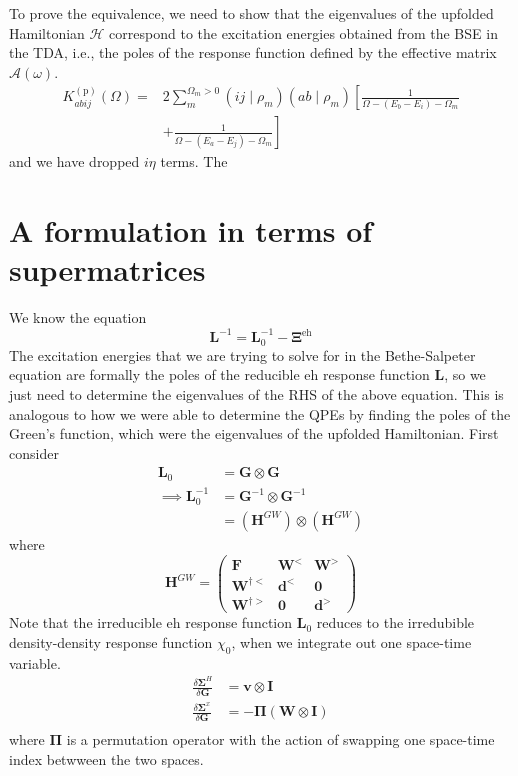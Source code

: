 To prove the equivalence, we need to show that the eigenvalues of the upfolded Hamiltonian $\mathcal{H}$ correspond to the excitation energies obtained from the BSE in the TDA, i.e., the poles of the response function defined by the effective matrix $\mathcal{A}(\omega)$.
$$
\begin{aligned}
K_{a b i j}^{(\mathrm{p})}(\Omega)= & 2 \sum_m^{\Omega_m>0}\left(i j \mid \rho_m\right)\left(a b \mid \rho_m\right)\left[\frac{1}{\Omega-\left(E_b-E_i\right)-\Omega_m}\right. \\
& \left.+\frac{1}{\Omega-\left(E_a-E_j\right)-\Omega_m}\right]
\end{aligned}
$$
 and we have dropped $i \eta$ terms. The
\section{A formulation in terms of supermatrices}
We know the equation
\begin{equation}
    \bm{L}^{-1} = \bm{L}_0^{-1} - \bm{\Xi}^{\mathrm{eh}}
\end{equation}
The excitation energies that we are trying to solve for in the Bethe-Salpeter equation are formally the poles of the reducible eh response function $\bm{L}$, so we just need to determine the eigenvalues of the RHS of the above equation. This is analogous to how we were able to determine the QPEs by finding the poles of the Green's function, which were the eigenvalues of the upfolded Hamiltonian. First consider 
\begin{align}
\bm{L}_0 &= \bm{G} \otimes \bm{G}\\
\implies \bm{L}_0^{-1} &= \bm{G}^{-1} \otimes \bm{G}^{-1} \\
&=(\bm{H}^{GW}) \otimes (\bm{H}^{GW})
\end{align}
where 
\begin{equation}
    \bm{H}^{GW} = \begin{pmatrix} \bm{F} & \bm{W}^< & \bm{W}^> \\ \bm{W}^{\dagger<} & \bm{d}^< & \bm{0} \\ \bm{W}^{\dagger>} & \bm{0} & \bm{d}^> \end{pmatrix}
\end{equation}
Note that the irreducible eh response function $\bm{L}_0$ reduces to the irredubible density-density response function $\chi_0$, when we integrate out one space-time variable.
\begin{align}
    \frac{\delta \bm{\Sigma }^H}{\delta \bm{G}} &= \bm{v} \otimes \bm{I} \\
    \frac{\delta \bm{\Sigma }^x}{\delta \bm{G}} &= -\bm{\Pi}\left(\bm{W} \otimes \bm{I}\right) \\
\end{align}
where $\bm{\Pi}$ is a permutation operator with the action of swapping one space-time index betwween the two spaces.

